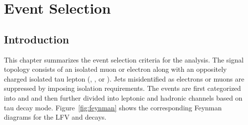 %
%

\chapter{Event Selection}
\label{event_sel}

\section{Introduction}
\label{evt_sel_intro}
This chapter summarizes the event selection criteria for the analysis. The signal topology consists of an isolated muon or electron along with an oppositely charged isolated tau lepton (\taum, \taue, or \tauh). Jets misidentified as electrons or muons are suppressed by imposing isolation requirements. The events are first categorized into \mutau and \etau and then further divided into leptonic and hadronic channels based on tau decay mode. Figure~\ref{fig:feynman} shows the corresponding Feynman diagrams for the LFV \Hmt and \Het decays.

